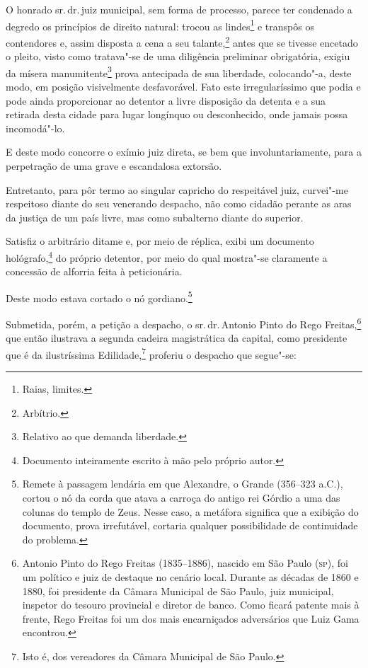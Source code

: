 O honrado sr.\,dr.\,juiz municipal, sem forma de processo, parece ter
condenado a degredo os princípios de direito natural: trocou as
lindes\footnote{Raias, limites.} e transpôs os contendores e, assim
disposta a cena a seu talante,\footnote{Arbítrio.} antes que se
tivesse encetado o pleito, visto como tratava"-se de uma diligência
preliminar obrigatória, exigiu da mísera manumitente\footnote{Relativo
  ao que demanda liberdade.} prova antecipada de sua liberdade,
colocando"-a, deste modo, em posição visivelmente desfavorável. Fato este
irregularíssimo que podia e pode ainda proporcionar ao detentor a livre
disposição da detenta e a sua retirada desta cidade para lugar longínquo
ou desconhecido, onde jamais possa incomodá"-lo.

E deste modo concorre o exímio juiz direta, se bem que
involuntariamente, para a perpetração de uma grave e escandalosa
extorsão.

Entretanto, para pôr termo ao singular capricho do respeitável juiz,
curvei"-me respeitoso diante do seu venerando despacho, não como cidadão
perante as aras da justiça de um país livre, mas como subalterno diante
do superior.

Satisfiz o arbitrário ditame e, por meio de réplica, exibi um documento
hológrafo,\footnote{Documento inteiramente escrito à mão pelo próprio
  autor.} do próprio detentor, por meio do qual mostra"-se claramente a
concessão de alforria feita à peticionária.

Deste modo estava cortado o nó gordiano.\footnote{Remete à passagem \label{gordio}
  lendária em que Alexandre, o Grande (356--323 a.C.), cortou o nó da
  corda que atava a carroça do antigo rei Górdio a uma das colunas do
  templo de Zeus. Nesse caso, a metáfora significa que a exibição do
  documento, prova irrefutável, cortaria qualquer possibilidade de
  continuidade do problema.}

Submetida, porém, a petição a despacho, o sr.\,dr.\,Antonio Pinto do Rego
Freitas,\footnote{Antonio Pinto do Rego Freitas (1835--1886), nascido em
  São Paulo (\textsc{sp}), foi um político e juiz de destaque no cenário local.
  Durante as décadas de 1860 e 1880, foi presidente da Câmara Municipal
  de São Paulo, juiz municipal, inspetor do tesouro provincial e diretor
  de banco. Como ficará patente mais à frente, Rego Freitas foi um dos
  mais encarniçados adversários que Luiz Gama encontrou.} que então
ilustrava a segunda cadeira magistrática da capital, como presidente que
é da ilustríssima Edilidade,\footnote{Isto é, dos vereadores da Câmara
  Municipal de São Paulo.} proferiu o despacho que segue"-se:

